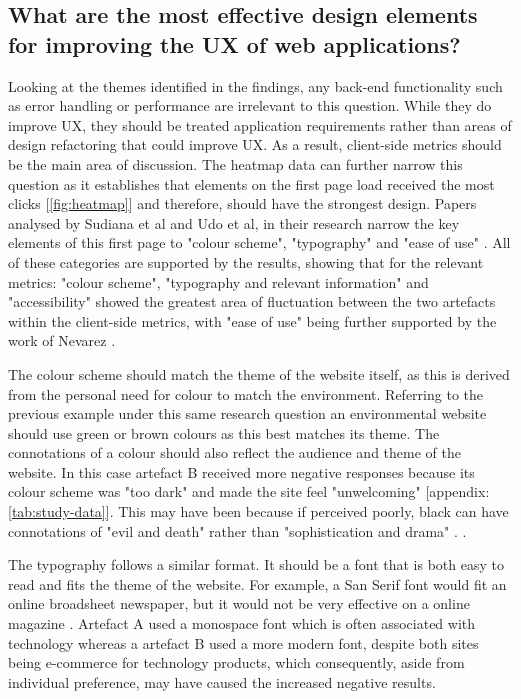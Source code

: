 \documentclass[article]{IEEEtran}
\begin{document}
        \subsection{What are the most effective design elements for improving the UX of web applications?}
            Looking at the themes identified in the  findings, any back-end functionality such as error handling or performance are irrelevant to this question. While they do improve UX, they should be treated application requirements rather than areas of design refactoring that could improve UX. As a result, client-side metrics should be the main area of discussion. The heatmap data can further narrow this question as it establishes that elements on the first page load received the most clicks [\autoref{fig:heatmap}] and therefore, should have the strongest design. Papers analysed by Sudiana et al and Udo et al, in their research narrow the key elements of this first page to "colour scheme", "typography" and "ease of use" \cite{sudiana, udo}. All of these categories are supported by the results, showing that for the relevant metrics: "colour scheme", "typography and relevant information" and "accessibility" showed the greatest area of fluctuation between the two artefacts within the client-side metrics, with "ease of use" being further supported by the work of Nevarez \cite{nevarez}. 
            
            The colour scheme should match the theme of the website itself, as this is derived from the personal need for colour to match the environment. Referring to the previous example under this same research question an environmental website should use green or brown colours as this best matches its theme. The connotations of a colour should also reflect the audience and theme of the website. In this case artefact B received more negative responses because its colour scheme was "too dark" and made the site feel "unwelcoming" [appendix: \autoref{tab:study-data}]. This may have been because if perceived poorly, black can have connotations of "evil and death" rather than "sophistication and drama" \cite{lanyi}. .
            
            The typography follows a similar format. It should be a font that is both easy to read and fits the theme of the website. For example, a San Serif font would fit an online broadsheet newspaper, but it would not be very effective on a online magazine \cite{shaikh}. Artefact A used a monospace font which is often associated with technology \cite{shaikh} whereas a artefact B used a more modern font, despite both sites being e-commerce for technology products, which consequently, aside from individual preference, may have caused the increased negative results. 
            
\end{document}
